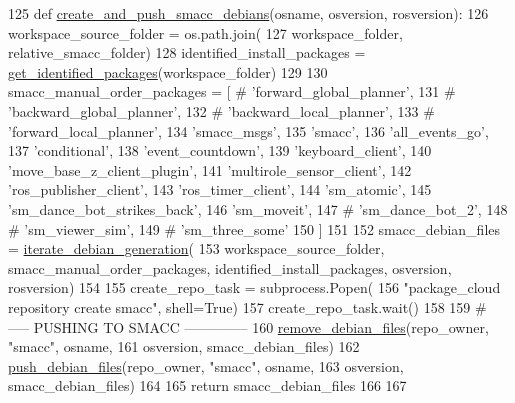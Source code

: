 \begin{DoxyCode}
125 \textcolor{keyword}{def }\hyperlink{namespacegenerate__debs_af7237c463c8e5b4df369e6befc154c50}{create\_and\_push\_smacc\_debians}(osname, osversion, rosversion):
126     workspace\_source\_folder = os.path.join(
127         workspace\_folder, relative\_smacc\_folder)
128     identified\_install\_packages = \hyperlink{namespacegenerate__debs_aa91b87c6d9c3ed04015845cc9298431a}{get\_identified\_packages}(workspace\_folder)
129 
130     smacc\_manual\_order\_packages = [  \textcolor{comment}{# 'forward\_global\_planner',}
131         \textcolor{comment}{# 'backward\_global\_planner',}
132         \textcolor{comment}{# 'backward\_local\_planner',}
133         \textcolor{comment}{# 'forward\_local\_planner',}
134         \textcolor{stringliteral}{'smacc\_msgs'},
135         \textcolor{stringliteral}{'smacc'},
136         \textcolor{stringliteral}{'all\_events\_go'},
137         \textcolor{stringliteral}{'conditional'},
138         \textcolor{stringliteral}{'event\_countdown'},
139         \textcolor{stringliteral}{'keyboard\_client'},
140         \textcolor{stringliteral}{'move\_base\_z\_client\_plugin'},
141         \textcolor{stringliteral}{'multirole\_sensor\_client'},
142         \textcolor{stringliteral}{'ros\_publisher\_client'},
143         \textcolor{stringliteral}{'ros\_timer\_client'},
144         \textcolor{stringliteral}{'sm\_atomic'},
145         \textcolor{stringliteral}{'sm\_dance\_bot\_strikes\_back'},
146         \textcolor{stringliteral}{'sm\_moveit'},
147         \textcolor{comment}{#        'sm\_dance\_bot\_2',}
148         \textcolor{comment}{#        'sm\_viewer\_sim',}
149         \textcolor{comment}{#        'sm\_three\_some'}
150     ]
151 
152     smacc\_debian\_files = \hyperlink{namespacegenerate__debs_a2615a6fc7860b6aa9e920e6b4d886589}{iterate\_debian\_generation}(
153         workspace\_source\_folder, smacc\_manual\_order\_packages, identified\_install\_packages, osversion, 
      rosversion)
154 
155     create\_repo\_task = subprocess.Popen(
156         \textcolor{stringliteral}{"package\_cloud repository create smacc"}, shell=\textcolor{keyword}{True})
157     create\_repo\_task.wait()
158 
159     \textcolor{comment}{# ----- PUSHING TO SMACC --------------}
160     \hyperlink{namespacegenerate__debs_a08095040d038b3613ad0e77fd4e7f60e}{remove\_debian\_files}(repo\_owner, \textcolor{stringliteral}{"smacc"},  osname,
161                         osversion, smacc\_debian\_files)
162     \hyperlink{namespacegenerate__debs_a9b22f5ad65b40b7903c467eda308e575}{push\_debian\_files}(repo\_owner, \textcolor{stringliteral}{"smacc"},  osname,
163                       osversion, smacc\_debian\_files)
164 
165     \textcolor{keywordflow}{return} smacc\_debian\_files
166 
167 
\end{DoxyCode}

